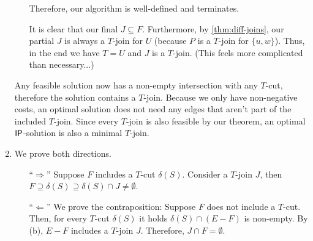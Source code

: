 \begin{aufgabe}
\begin{enumerate}[label=(\alph*)]
\begin{itemize}
                      Therefore, our algorithm is well-defined and terminates.

                      It is clear that our final $J \subseteq F$.
                      Furthermore, by \autoref{thm:diff-joins}, our partial $J$ is always a $T$-join for $U$ (because $P$ is a $T$-join for $\{u,w\}$).
                      Thus, in the end we have $T = U$ and $J$ is a $T$-join. (This feels more complicated than necessary...)
              \end{itemize}
              Any feasible solution now has a non-empty intersection with any $T$-cut, therefore the solution contains a $T$-join.
              Because we only have non-negative costs, an optimal solution does not
              need any edges that aren't part of the included $T$-join. Since every $T$-join is also feasible by our theorem,
              an optimal $\mathsf{IP}$-solution is also a minimal $T$-join.
        \item We prove both directions.
              \begin{itemize}
                  \item[\enquote{$\Rightarrow$}] Suppose $F$ includes a $T$-cut $\delta(S)$.
                      Consider a $T$-join $J$, then $F \supseteq \delta(S) \supseteq \delta(S) \cap J \neq \emptyset$.
                  \item[\enquote{$\Leftarrow$}] We prove the contraposition: Suppose $F$ does not include a $T$-cut.
                      Then, for every $T$-cut $\delta(S)$ it holds $\delta(S) \cap (E-F)$ is non-empty.
                      By (b), $E-F$ includes a $T$-join $J$. Therefore, $J \cap F = \emptyset$.
              \end{itemize}
    \end{enumerate}
\end{aufgabe}